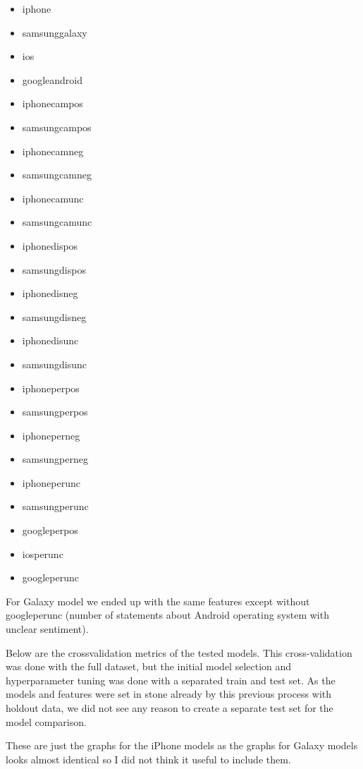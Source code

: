 \documentclass[12pt,a4paper,leqno]{report}
\theoremstyle{plain}
\theoremstyle{definition}
\theoremstyle{remark}
\begin{document}
\begin{itemize}
    \item iphone
    \item samsunggalaxy
    \item ios
    \item googleandroid
    \item iphonecampos
    \item samsungcampos
    \item iphonecamneg
    \item samsungcamneg
    \item iphonecamunc
    \item samsungcamunc
    \item iphonedispos
    \item samsungdispos
    \item iphonedisneg
    \item samsungdisneg
    \item iphonedisunc
    \item samsungdisunc
    \item iphoneperpos
    \item samsungperpos
    \item iphoneperneg
    \item samsungperneg
    \item iphoneperunc
    \item samsungperunc
    \item googleperpos
    \item iosperunc
    \item googleperunc
\end{itemize}

For Galaxy model we ended up with the same features except without googleperunc
(number of statements about Android operating system with unclear sentiment).

Below are the crossvalidation metrics of the tested models.
This cross-validation was done with the full dataset, but the initial model selection and hyperparameter tuning was done with a separated train
and test set. As the models and features were set in stone already by this previous process with holdout data, we did not see any reason to create a separate
test set for the model comparison.

These are just the graphs for the iPhone models as the graphs for Galaxy models looks almost identical so I
did not think it useful to include them.
\end{document}
